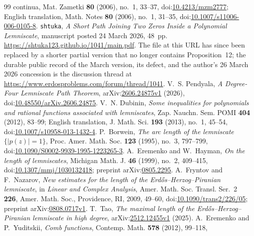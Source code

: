 \begin{thebibliography}{99}
{  continua}, Mat. Zametki \textbf{80} (2006), no.~1, 33--37,
  doi:\href{https://doi.org/10.4213/mzm2777}{10.4213/mzm2777}; English
  translation, Math. Notes \textbf{80} (2006), no.~1, 31--35,
  doi:\href{https://doi.org/10.1007/s11006-006-0105-8}{10.1007/s11006-006-0105-8}.
 \texttt{shtuka},
  \emph{A Short Path Joining Two Zeros Inside a Polynomial Lemniscate},
  manuscript posted 24 March 2026, 48~pp.
  \url{https://shtuka123.github.io/1041/main.pdf}.
  The file at this URL has since been replaced by a shorter partial version
  that no longer contains Proposition~12; the durable public record of the
  March version, its defect, and the author's 26 March 2026 concession is the
  discussion thread at
  \url{https://www.erdosproblems.com/forum/thread/1041}.
 V.~S. Pendyala,
  \emph{A Degree-Four Lemniscate Path Theorem},
  arXiv:\href{https://arxiv.org/abs/2606.24875v1}{2606.24875v1} (2026),
  doi:\href{https://doi.org/10.48550/arXiv.2606.24875}
  {10.48550/arXiv.2606.24875}.
 V.~N. Dubinin, \emph{Some inequalities for polynomials and
  rational functions associated with lemniscates}, Zap. Nauchn. Sem. POMI
  \textbf{404} (2012), 83--99; English translation, J. Math. Sci. \textbf{193}
  (2013), no.~1, 45--54,
  doi:\href{https://doi.org/10.1007/s10958-013-1432-4}{10.1007/s10958-013-1432-4}.
 P.~Borwein,
  \emph{The arc length of the lemniscate $\{|p(z)|=1\}$},
  Proc. Amer. Math. Soc. \textbf{123} (1995), no.~3, 797--799,
  doi:\href{https://doi.org/10.1090/S0002-9939-1995-1223265-3}
  {10.1090/S0002-9939-1995-1223265-3}.
 A.~Eremenko and W.~Hayman,
  \emph{On the length of lemniscates}, Michigan Math. J. \textbf{46}
  (1999), no.~2, 409--415,
  doi:\href{https://doi.org/10.1307/mmj/1030132418}{10.1307/mmj/1030132418};
  preprint arXiv:\href{https://arxiv.org/abs/0805.2295}{0805.2295}.
 A.~Fryntov and F.~Nazarov,
  \emph{New estimates for the length of the Erd\H{o}s--Herzog--Piranian lemniscate},
  in \emph{Linear and Complex Analysis}, Amer. Math. Soc. Transl. Ser.~2
  \textbf{226}, Amer. Math. Soc., Providence, RI, 2009, 49--60,
  doi:\href{https://doi.org/10.1090/trans2/226/05}{10.1090/trans2/226/05};
  preprint arXiv:\href{https://arxiv.org/abs/0808.0717v1}{0808.0717v1}.
 T.~Tao,
  \emph{The maximal length of the Erd\H{o}s--Herzog--Piranian lemniscate in
  high degree}, arXiv:\href{https://arxiv.org/abs/2512.12455v1}{2512.12455v1}
  (2025).
 A.~Eremenko and P.~Yuditskii,
  \emph{Comb functions}, Contemp. Math. \textbf{578} (2012), 99--118,

\end{thebibliography}
